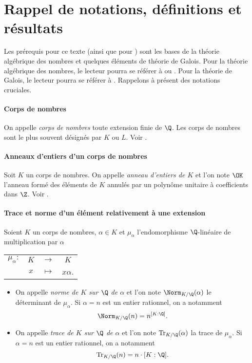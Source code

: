 \section*{Rappel de notations, définitions et résultats}\label{section-notations}

Les prérequis pour ce texte (ainsi que pour \cite{article}) sont les bases de la théorie algébrique des nombres et quelques éléments de théorie de Galois. Pour la théorie algébrique des nombres, le lecteur pourra se référer à \cite[ch. II, III, V et VI]{Samuel} ou \cite[ch. II, III et IV]{Kraus}. Pour la théorie de Galois, le lecteur pourra se référer à \cite[ch. XXIII à XVII]{GrandCombat}. Rappelons à présent des notations cruciales.

\paragraph{Corps de nombres} On appelle \emph{corps de nombres} toute extension finie de $\Q$. Les corps de nombres sont le plus souvent désignés par $K$ ou $L$. Voir \cite[ch. II § 8]{Samuel}.

\paragraph{Anneaux d'entiers d'un corps de nombres} Soit $K$ un corps de nombres. On appelle \emph{anneau d'entiers de $K$} et l'on note $\OK$ l'anneau formé des éléments de $K$ annulés par un polynôme unitaire à coefficients dans $\Z$. Voir \cite[ch. II]{Samuel}.

\paragraph{Trace et norme d'un élément relativement à une extension} Soient $K$ un corps de nombres, $\alpha\in K$ et $\mu_\alpha$ l'endomorphisme $\Q$-linéaire de multiplication par $\alpha$ 
\begin{center}
	\begin{tabular}{rccc}
		$\mu_\alpha : $ & $K$ & $\longrightarrow$ & $K$ \\
		& $x$	& $\longmapsto$ & $x\alpha$.
	\end{tabular}
\end{center}

\begin{itemize}
	\item On appelle \emph{norme de $K$ sur $\Q$ de $\alpha$} et l'on note $\Norm_{K/\Q}(\alpha)$ le déterminant de $\mu_\alpha$. Si $\alpha=n$ est un entier rationnel, on a notamment \[\Norm_{K/\Q}(n) = n^{[K : \Q]}.\]
	\item On appelle \emph{trace de $K$ sur $\Q$ de $\alpha$} et l'on note $\mathrm{Tr}_{K/\Q}(\alpha)$ la trace de $\mu_\alpha$. Si $\alpha= n$ est un entier rationnel, on a notamment \[\mathrm{Tr}_{K/\Q}(n) = n\cdot{[K : \Q]}.\]
\end{itemize}


